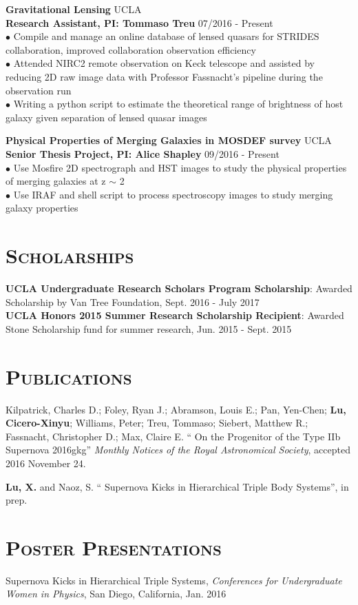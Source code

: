 \documentclass[line, margin]{res}
\begin{document}
\begin{resume}
\textbf{Gravitational Lensing } \hfill UCLA\\
\textbf{Research Assistant,  PI: Tommaso Treu}  \hfill 07/2016 - Present\\
$\bullet$ Compile and manage an online database of lensed quasars for STRIDES collaboration, improved collaboration observation efficiency\\
$\bullet$ Attended NIRC2 remote observation on Keck telescope and assisted by reducing 2D raw image data with Professor Fassnacht's pipeline during the observation run\\
$\bullet$ Writing a python script to estimate the theoretical range of brightness of host galaxy given separation of lensed quasar images

\textbf{Physical Properties of Merging Galaxies in MOSDEF survey} \hfill UCLA\\
\textbf{Senior Thesis Project,  PI: Alice Shapley}  \hfill 09/2016 - Present\\
$\bullet$ Use Mosfire 2D spectrograph and HST images to study the physical properties of merging galaxies at z $\sim$ 2\\
$\bullet$ Use IRAF and shell script to process spectroscopy images to study merging galaxy properties

\section{\textsc{Scholarships} }
\textbf{UCLA Undergraduate Research Scholars Program Scholarship}: Awarded Scholarship by Van Tree Foundation, Sept. 2016 - July 2017\\
\textbf{UCLA Honors 2015 Summer Research Scholarship Recipient}: Awarded Stone Scholarship fund for summer research, Jun. 2015 - Sept. 2015

\section{\textsc{Publications} }
Kilpatrick, Charles D.; Foley, Ryan J.; Abramson, Louis E.; Pan, Yen-Chen; \textbf{Lu, Cicero-Xinyu}; Williams, Peter; Treu, Tommaso; Siebert, Matthew R.; Fassnacht, Christopher D.; Max, Claire E.  \enquote{ On the Progenitor of the Type IIb Supernova 2016gkg} \textsl{Monthly Notices of the Royal Astronomical Society}, accepted 2016 November 24.

\textbf{Lu, X.} and Naoz, S. \enquote{ Supernova Kicks in Hierarchical Triple Body Systems}, in prep.
\newpage
\section{\textsc{Poster Presentations} }
Supernova Kicks in Hierarchical Triple Systems, \textsl{Conferences for Undergraduate Women in Physics}, San Diego, California, Jan. 2016


\end{resume}
\end{document}
